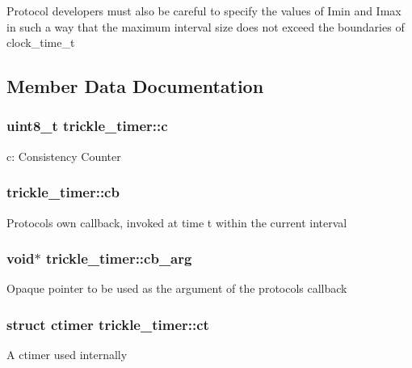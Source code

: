 Protocol developers must also be careful to specify the values of Imin and Imax in such a way that the maximum interval size does not exceed the boundaries of clock\+\_\+time\+\_\+t 

\subsection{Member Data Documentation}
\hypertarget{structtrickle__timer_a0a68c3dfc466cbdbfbc8e1cc1fd910fe}{}
\subsubsection[{c}]{\setlength{\rightskip}{0pt plus 5cm}uint8\+\_\+t trickle\+\_\+timer\+::c}\label{structtrickle__timer_a0a68c3dfc466cbdbfbc8e1cc1fd910fe}
c\+: Consistency Counter \hypertarget{structtrickle__timer_a7cf2370dcfcb2984770ad4f37a1524e9}{}
\subsubsection[{cb}]{ trickle\+\_\+timer\+::cb}\label{structtrickle__timer_a7cf2370dcfcb2984770ad4f37a1524e9}
Protocol\textquotesingle{}s own callback, invoked at time t within the current interval \hypertarget{structtrickle__timer_a1b10a45b744a240c4c6a4eaeffc8d82c}{}
\subsubsection[{cb\+\_\+arg}]{\setlength{\rightskip}{0pt plus 5cm}void$\ast$ trickle\+\_\+timer\+::cb\+\_\+arg}\label{structtrickle__timer_a1b10a45b744a240c4c6a4eaeffc8d82c}
Opaque pointer to be used as the argument of the protocol\textquotesingle{}s callback \hypertarget{structtrickle__timer_abba9590b99980735bac34f144b151e0d}{}
\subsubsection[{ct}]{\setlength{\rightskip}{0pt plus 5cm}struct ctimer trickle\+\_\+timer\+::ct}\label{structtrickle__timer_abba9590b99980735bac34f144b151e0d}
A ctimer used internally \hypertarget{structtrickle__timer_a2e49b516f2674d3c8e0fecdd72db0c8e}{}

